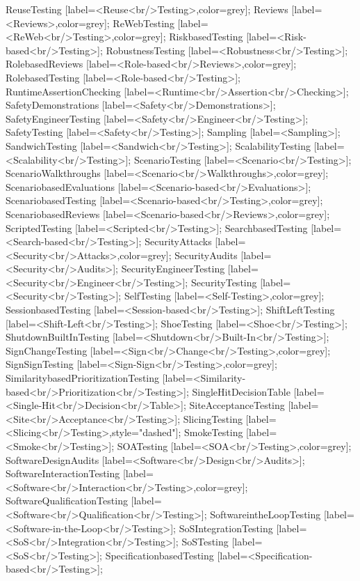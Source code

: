 \documentclass{article}
\begin{document}
{ReuseTesting [label=<Reuse<br/>Testing>,color=grey];
Reviews [label=<Reviews>,color=grey];
ReWebTesting [label=<ReWeb<br/>Testing>,color=grey];
RiskbasedTesting [label=<Risk-based<br/>Testing>];
RobustnessTesting [label=<Robustness<br/>Testing>];
RolebasedReviews [label=<Role-based<br/>Reviews>,color=grey];
RolebasedTesting [label=<Role-based<br/>Testing>];
RuntimeAssertionChecking [label=<Runtime<br/>Assertion<br/>Checking>];
SafetyDemonstrations [label=<Safety<br/>Demonstrations>];
SafetyEngineerTesting [label=<Safety<br/>Engineer<br/>Testing>];
SafetyTesting [label=<Safety<br/>Testing>];
Sampling [label=<Sampling>];
SandwichTesting [label=<Sandwich<br/>Testing>];
ScalabilityTesting [label=<Scalability<br/>Testing>];
ScenarioTesting [label=<Scenario<br/>Testing>];
ScenarioWalkthroughs [label=<Scenario<br/>Walkthroughs>,color=grey];
ScenariobasedEvaluations [label=<Scenario-based<br/>Evaluations>];
ScenariobasedTesting [label=<Scenario-based<br/>Testing>,color=grey];
ScenariobasedReviews [label=<Scenario-based<br/>Reviews>,color=grey];
ScriptedTesting [label=<Scripted<br/>Testing>];
SearchbasedTesting [label=<Search-based<br/>Testing>];
SecurityAttacks [label=<Security<br/>Attacks>,color=grey];
SecurityAudits [label=<Security<br/>Audits>];
SecurityEngineerTesting [label=<Security<br/>Engineer<br/>Testing>];
SecurityTesting [label=<Security<br/>Testing>];
SelfTesting [label=<Self-Testing>,color=grey];
SessionbasedTesting [label=<Session-based<br/>Testing>];
ShiftLeftTesting [label=<Shift-Left<br/>Testing>];
ShoeTesting [label=<Shoe<br/>Testing>];
ShutdownBuiltInTesting [label=<Shutdown<br/>Built-In<br/>Testing>];
SignChangeTesting [label=<Sign<br/>Change<br/>Testing>,color=grey];
SignSignTesting [label=<Sign-Sign<br/>Testing>,color=grey];
SimilaritybasedPrioritizationTesting [label=<Similarity-based<br/>Prioritization<br/>Testing>];
SingleHitDecisionTable [label=<Single-Hit<br/>Decision<br/>Table>];
SiteAcceptanceTesting [label=<Site<br/>Acceptance<br/>Testing>];
SlicingTesting [label=<Slicing<br/>Testing>,style="dashed"];
SmokeTesting [label=<Smoke<br/>Testing>];
SOATesting [label=<SOA<br/>Testing>,color=grey];
SoftwareDesignAudits [label=<Software<br/>Design<br/>Audits>];
SoftwareInteractionTesting [label=<Software<br/>Interaction<br/>Testing>,color=grey];
SoftwareQualificationTesting [label=<Software<br/>Qualification<br/>Testing>];
SoftwareintheLoopTesting [label=<Software-in-the-Loop<br/>Testing>];
SoSIntegrationTesting [label=<SoS<br/>Integration<br/>Testing>];
SoSTesting [label=<SoS<br/>Testing>];
SpecificationbasedTesting [label=<Specification-based<br/>Testing>];
}
\end{document}
